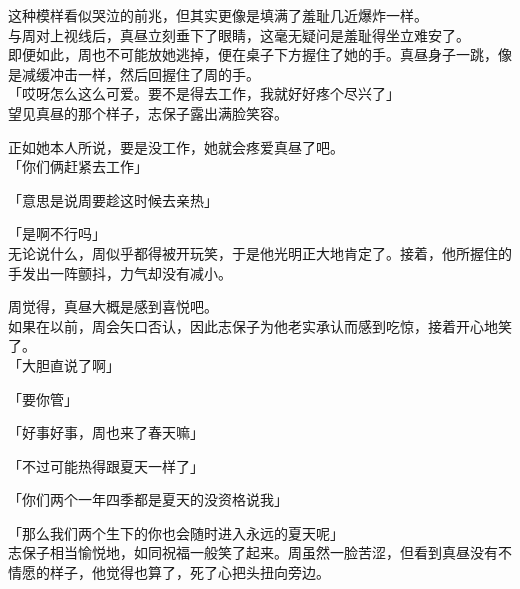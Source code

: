 这种模样看似哭泣的前兆，但其实更像是填满了羞耻几近爆炸一样。\\

与周对上视线后，真昼立刻垂下了眼睛，这毫无疑问是羞耻得坐立难安了。\\

即便如此，周也不可能放她逃掉，便在桌子下方握住了她的手。真昼身子一跳，像是减缓冲击一样，然后回握住了周的手。\\

「哎呀怎么这么可爱。要不是得去工作，我就好好疼个尽兴了」\\

望见真昼的那个样子，志保子露出满脸笑容。

正如她本人所说，要是没工作，她就会疼爱真昼了吧。\\

「你们俩赶紧去工作」

「意思是说周要趁这时候去亲热」

「是啊不行吗」\\

无论说什么，周似乎都得被开玩笑，于是他光明正大地肯定了。接着，他所握住的手发出一阵颤抖，力气却没有减小。

周觉得，真昼大概是感到喜悦吧。\\

如果在以前，周会矢口否认，因此志保子为他老实承认而感到吃惊，接着开心地笑了。\\

「大胆直说了啊」

「要你管」

「好事好事，周也来了春天嘛」

「不过可能热得跟夏天一样了」

「你们两个一年四季都是夏天的没资格说我」

「那么我们两个生下的你也会随时进入永远的夏天呢」\\

志保子相当愉悦地，如同祝福一般笑了起来。周虽然一脸苦涩，但看到真昼没有不情愿的样子，他觉得也算了，死了心把头扭向旁边。
